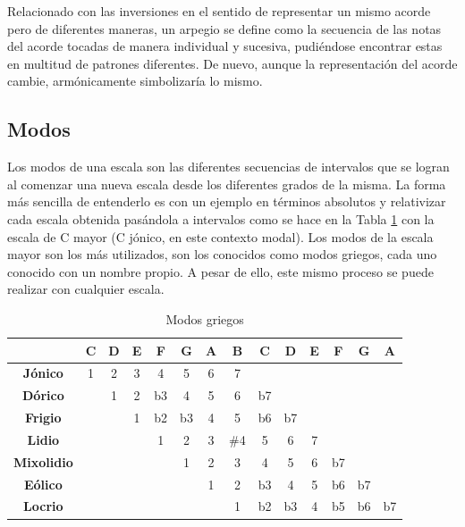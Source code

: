 Relacionado con las inversiones en el sentido de representar un mismo acorde pero de diferentes maneras, un arpegio se define como la secuencia de las notas del acorde tocadas de manera individual y sucesiva, pudiéndose encontrar estas en multitud de patrones diferentes. De nuevo, aunque la representación del acorde cambie, armónicamente simbolizaría lo mismo.

\subsection{Modos}\label{sec:modos}

Los modos de una escala son las diferentes secuencias de intervalos que se logran al comenzar una nueva escala desde los diferentes grados de la misma. La forma más sencilla de entenderlo es con un ejemplo en términos absolutos y relativizar cada escala obtenida pasándola a intervalos como se hace en la Tabla \ref{tab:modos_C} con la escala de C mayor (C jónico, en este contexto modal). Los modos de la escala mayor son los más utilizados, son los  conocidos como modos griegos, cada uno conocido con un nombre propio. A pesar de ello, este mismo proceso se puede realizar con cualquier escala.

\begin{table}[h]
    \centering
    \begin{tabular}{c|c|c|c|c|c|c|c|c|c|c|c|c|c}
        \multicolumn{1}{c}{}& \textbf{C} & D & E & F & G  & A & B & \textbf{C} & D & E & F & G & A\\
        \hline
        \hline
        \textbf{Jónico} & 1 & 2 & 3 & 4 & 5 & 6 & 7  \\
        \cline{0-8}
        \textbf{Dórico} & & 1 & 2 & b3 & 4 & 5 & 6 & b7 \\
        \cline{0-0}
        \cline{3-10}
        \textbf{Frigio} &\multicolumn{2}{c|}{} & 1 & b2 & b3 & 4 & 5 & b6 & b7 \\
        \cline{0-0}
        \cline{4-11}
        \textbf{Lidio} &\multicolumn{3}{c|}{} & 1 & 2 & 3 & \#4 & 5 & 6 & 7 \\
        \cline{0-0}
        \cline{5-12}
        \textbf{Mixolidio} &\multicolumn{4}{c|}{} & 1 & 2 & 3 & 4 & 5 & 6 & b7 \\
        \cline{0-0}
        \cline{6-13}
        \textbf{Eólico} &\multicolumn{5}{c|}{} & 1 & 2 & b3 & 4 & 5 & b6 & b7 \\
        \cline{0-0}
        \cline{7-14}
        \textbf{Locrio} &\multicolumn{6}{c|}{} & 1 & b2 & b3 & 4 & b5 & b6 & \multicolumn{1}{c|}{b7} \\      
        \cline{8-14}
    \end{tabular}
    \caption{Modos griegos}
    \label{tab:modos_C}
\end{table}

